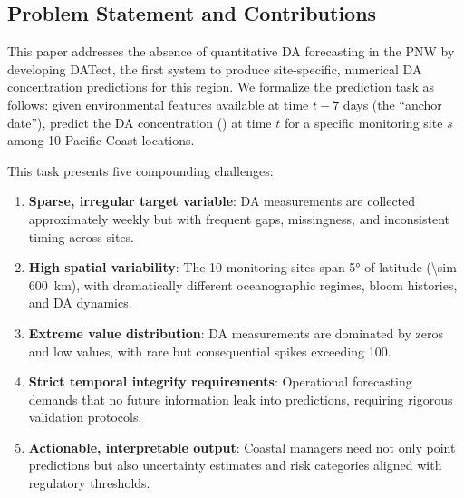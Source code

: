 \documentclass[preprint,12pt,authoryear]{elsarticle}
\begin{document}
\subsection{Problem Statement and Contributions}
\label{sec:intro-problem}

This paper addresses the absence of quantitative DA forecasting in the PNW by developing DATect, the first system to produce site-specific, numerical DA concentration predictions for this region. We formalize the prediction task as follows: given environmental features available at time $t - 7$ days (the ``anchor date''), predict the DA concentration (\si{\microgrampeg}) at time $t$ for a specific monitoring site $s$ among 10 Pacific Coast locations.

This task presents five compounding challenges:
\begin{enumerate}[nosep]
    \item \textbf{Sparse, irregular target variable}: DA measurements are collected approximately weekly but with frequent gaps, missingness, and inconsistent timing across sites.
    \item \textbf{High spatial variability}: The 10 monitoring sites span \ang{5} of latitude (\SI{\sim 600}{\kilo\meter}), with dramatically different oceanographic regimes, bloom histories, and DA dynamics.
    \item \textbf{Extreme value distribution}: DA measurements are dominated by zeros and low values, with rare but consequential spikes exceeding \SI{100}{\microgrampeg}.
    \item \textbf{Strict temporal integrity requirements}: Operational forecasting demands that no future information leak into predictions, requiring rigorous validation protocols.
    \item \textbf{Actionable, interpretable output}: Coastal managers need not only point predictions but also uncertainty estimates and risk categories aligned with regulatory thresholds.
\end{enumerate}
\end{document}
